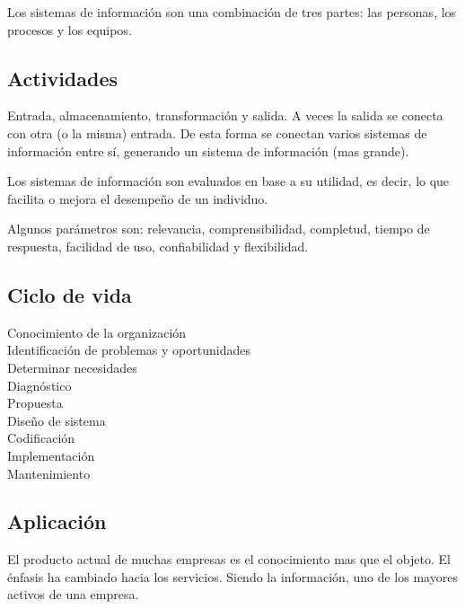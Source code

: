 Los sistemas de información son una combinación de tres partes: las personas, los procesos y los equipos.

\subsection{Actividades}

Entrada, almacenamiento, transformación y salida. A veces la salida se conecta con otra (o la misma) entrada. De esta forma se conectan varios sistemas de información entre sí, generando un sistema de información (mas grande).

Los sistemas de información son evaluados en base a su utilidad, es decir, lo que facilita o mejora el desempeño de un individuo.

Algunos parámetros son: relevancia, comprensibilidad, completud, tiempo de respuesta, facilidad de uso, confiabilidad y flexibilidad.

\subsection{Ciclo de vida}

\begin{description} %

    \item[Conocimiento de la organización]
    \item[Identificación de problemas y oportunidades] 
    \item[Determinar necesidades] 
    \item[Diagnóstico]
    \item[Propuesta] 
    \item[Diseño de sistema] 
    \item[Codificación]
    \item[Implementación] 
    \item[Mantenimiento] 
\end{description}

\subsection{Aplicación}

El producto actual de muchas empresas es el conocimiento mas que el objeto. El énfasis ha cambiado hacia los servicios. Siendo la información, uno de los mayores activos de una empresa. 